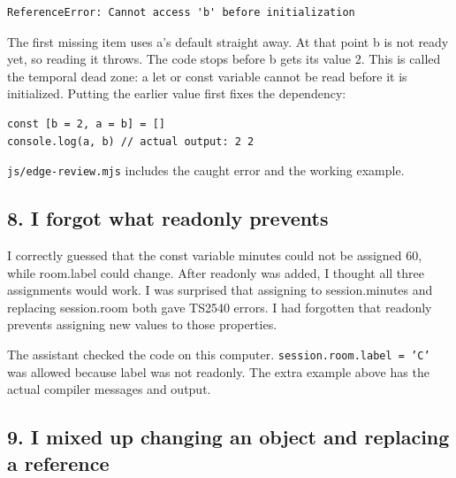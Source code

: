 \documentclass[
  10pt,
  a4paper,
]{article}
\begin{document}
\begin{minipage}{\linewidth}

\begin{lstlisting}
ReferenceError: Cannot access 'b' before initialization
\end{lstlisting}

\end{minipage}\par

The first missing item uses a's default straight away. At that point b
is not ready yet, so reading it throws. The code stops before b gets its
value 2. This is called the temporal dead zone: a let or const variable
cannot be read before it is initialized. Putting the earlier value first
fixes the dependency:

\begin{minipage}{\linewidth}

\begin{lstlisting}
const [b = 2, a = b] = []
console.log(a, b) // actual output: 2 2
\end{lstlisting}

\end{minipage}\par

\texttt{js/\allowbreak{}edge-review.\allowbreak{}mjs} includes the
caught error and the working example.

\subsection{8. I forgot what readonly
prevents}\label{i-forgot-what-readonly-prevents}

I correctly guessed that the const variable minutes could not be
assigned 60, while room.label could change. After readonly was added, I
thought all three assignments would work. I was surprised that assigning
to session.minutes and replacing session.room both gave TS2540 errors. I
had forgotten that readonly prevents assigning new values to those
properties.

The assistant checked the code on this computer.
\texttt{session.\allowbreak{}room.\allowbreak{}label = 'C'} was allowed
because label was not readonly. The extra example above has the actual
compiler messages and output.

\subsection{9. I mixed up changing an object and replacing a
reference}\label{i-mixed-up-changing-an-object-and-replacing-a-reference}
\end{document}
